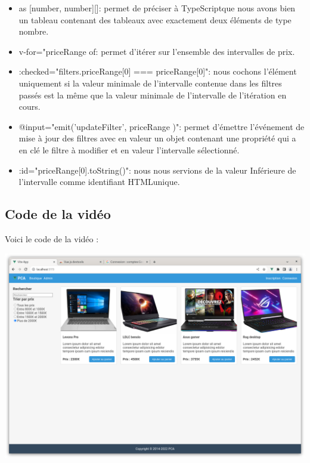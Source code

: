 \begin{itemize}
\item {\color{monOrange} as [number, number][]:} permet de préciser à TypeScriptque nous avons bien un tableau contenant des tableaux avec exactement deux éléments de type nombre.

\item {\color{monOrange} v-for="priceRange of:} permet d'itérer sur l'ensemble des intervalles de prix.

\item {\color{monOrange} :checked="filters.priceRange[0] === priceRange[0]":} nous cochons l'élément uniquement si la valeur minimale de l'intervalle contenue dans les filtres passés est la même que la valeur minimale de l'intervalle de l'itération en cours.

\item {\color{monOrange} @input="emit('updateFilter', { priceRange })": } permet d'émettre l'événement de mise à jour des filtres avec en valeur un objet contenant une propriété qui a en clé le filtre à modifier et en valeur l'intervalle sélectionné.

\item {\color{monOrange} :id="priceRange[0].toString()":} nous nous servions de la valeur Inférieure de l'intervalle comme identifiant HTMLunique.

\end{itemize}
\subsection{Code de la vidéo}
Voici le code de la vidéo :

\begin{center}
\includegraphics[width=15cm]{images/image26.png}
\end{center}

